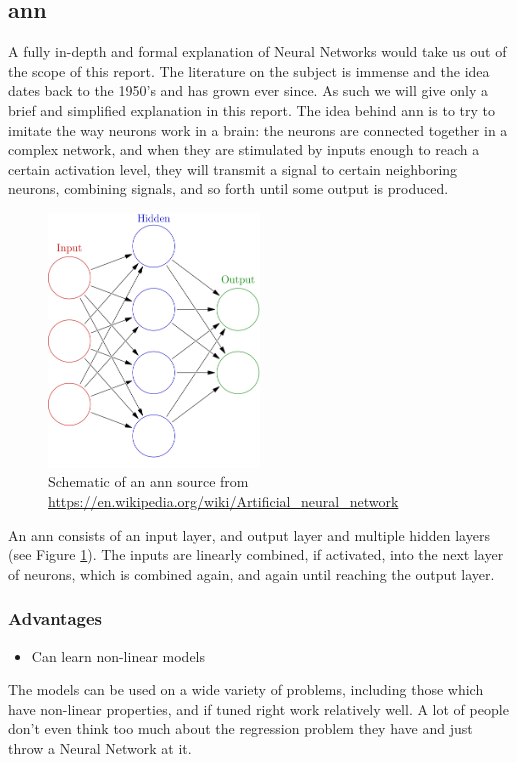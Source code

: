 \subsection{\acrlong{ann}}
A fully in-depth and formal explanation of Neural Networks would take us out of the scope of this report. The literature on the subject is immense and the idea dates back to the 1950's and has grown ever since. As such we will give only a brief and simplified explanation in this report.
The idea behind \acrfull{ann} is to try to imitate the way neurons work in a brain: the neurons are connected together in a complex network, and when they are stimulated by inputs enough to reach a certain activation level, they will transmit a signal to certain neighboring neurons, combining signals, and so forth until some output is produced.

\begin{figure}
	\centering
	\includegraphics[width=0.5\textwidth]{img/Colored_neural_network.png}
	\caption{Schematic of an \acrlong{ann} source from \url{https://en.wikipedia.org/wiki/Artificial_neural_network}}
	\label{fig:nn}
\end{figure}

An \acrshort{ann} consists of an input layer, and output layer and multiple hidden layers (see Figure \ref{fig:nn}). The inputs are linearly combined, if activated, into the next layer of neurons, which is combined again, and again until reaching the output layer.

\subsubsection{Advantages}
\begin{itemize}
\item Can learn non-linear models
\end{itemize}
The models can be used on a wide variety of problems, including those which have non-linear properties, and if tuned right work relatively well. A lot of people don't even think too much about the regression problem they have and just throw a Neural Network at it.

